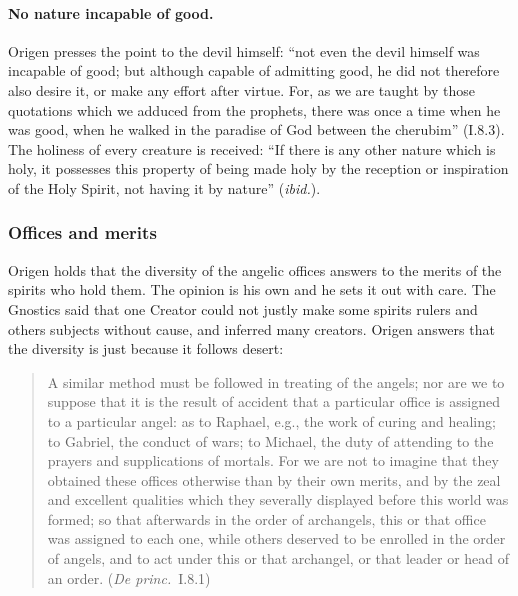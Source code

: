 \paragraph{No nature incapable of good.} Origen presses the point to the
devil himself: ``not even the devil himself was incapable of good; but
although capable of admitting good, he did not therefore also desire it,
or make any effort after virtue. For, as we are taught by those quotations
which we adduced from the prophets, there was once a time when he was
good, when he walked in the paradise of God between the cherubim''
(I.8.3). The holiness of every creature is received: ``If there is any
other nature which is holy, it possesses this property of being made holy
by the reception or inspiration of the Holy Spirit, not having it by
nature'' (\emph{ibid.}).

\subsubsection{Offices and merits}

Origen holds that the diversity of the angelic offices answers to the
merits of the spirits who hold them. The opinion is his own and he sets it
out with care. The Gnostics said that one Creator could not justly make
some spirits rulers and others subjects without cause, and inferred many
creators. Origen answers that the diversity is just because it follows
desert:

\begin{quote}
A similar method must be followed in treating of the angels; nor are we to
suppose that it is the result of accident that a particular office is
assigned to a particular angel: as to Raphael, e.g., the work of curing
and healing; to Gabriel, the conduct of wars; to Michael, the duty of
attending to the prayers and supplications of mortals. For we are not to
imagine that they obtained these offices otherwise than by their own
merits, and by the zeal and excellent qualities which they severally
displayed before this world was formed; so that afterwards in the order of
archangels, this or that office was assigned to each one, while others
deserved to be enrolled in the order of angels, and to act under this or
that archangel, or that leader or head of an order. (\emph{De princ.}\
I.8.1)
\end{quote}

